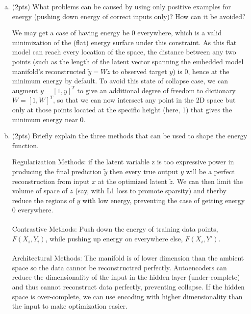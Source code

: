 \documentclass{article}
\begin{document}
\begin{enumerate}[(a)]
\item (2pts) What problems can be caused by using only positive examples for energy (pushing down energy of correct inputs only)? How can it be avoided?
\begin{tcolorbox}
    We may get a case of having energy be 0 everywhere,
    which is a valid minimization of the (flat) energy
    surface under this constraint. As this flat model can
    reach every location of
    the space, the distance between any two points (such as
    the length of the
    latent vector spanning the embedded model manifold's
    reconstructed
    $\tilde{y}=Wz$ to observed target $y$) is 0, hence at
    the minimum energy by default. To avoid this state of
    collapse
    case, we can augment $y
        = [1, y]^{T}$ to give an additional degree of
    freedom to dictionary $W=[1, W]^{T}$, so
    that we can now intersect any point in the 2D space but
    only at those points
    located at the specific height (here, 1) that gives the
    minimum energy near 0.
\end{tcolorbox}


\item 
(2pts) Briefly explain the three methods that can be used to shape the energy function.
\begin{tcolorbox}
    Regularization Methods: if the latent variable z is too
		      expressive power in producing the final prediction
		      $\tilde{y}$ then every true
		      output $y$ will be a perfect reconstruction from input
		      $x$ at the optimized
		      latent $\check{z}$. We can then limit the volume of space
		      of $z$ (say, with L1 loss to promote sparsity) and therby
		      reduce the regions of
		      $y$ with low energy, preventing the case of getting
		      energy 0 everywhere.\\\\
		      Contrastive Methods: Push down the energy of training
		      data points, $F(X_i,Y_i)$, while pushing up energy on
		      everywhere else,
		      $F(X_i,Y')$.\\ \\
		      Architectural Methods: The manifold is of lower
		      dimension than the ambient space so the data cannot be
		      reconstructred
		      perfectly. Autoencoders can reduce the dimensionality of
		      the input in the
		      hidden layer (under-complete) and thus cannot reconstruct
		      data perfectly,
		      preventing collapse. If the hidden space is
		      over-complete, we can use encoding
		      with higher dimensionality than the input to make
		      optimization easier.
\end{tcolorbox}



\end{enumerate}
\end{document}
